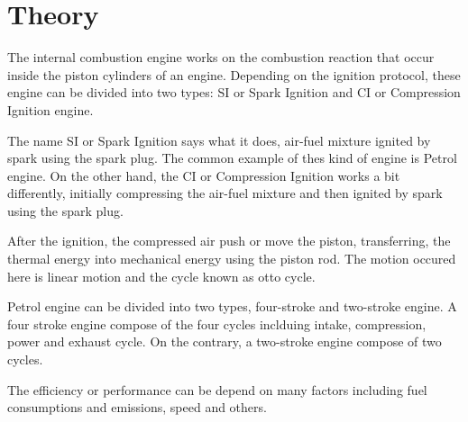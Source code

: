 \section{Theory}

The internal combustion engine works on the combustion reaction that occur inside the piston cylinders of an engine. Depending on the ignition protocol, these engine can be divided into two types: SI or Spark Ignition and CI or Compression Ignition engine.

The name SI or Spark Ignition says what it does, air-fuel mixture ignited by spark using the spark plug. The common example of thes kind of engine is Petrol engine. On the other hand, the CI or Compression Ignition works a bit differently, initially compressing the air-fuel mixture and then ignited by spark using the spark plug.

After the ignition, the compressed air push or move the piston, transferring, the thermal energy into mechanical energy using the piston rod. The motion occured here is linear motion and the cycle known as otto cycle.

Petrol engine can be divided into two types, four-stroke and two-stroke engine. A four stroke engine compose of the four cycles inclduing intake, compression, power and exhaust cycle. On the contrary, a two-stroke engine compose of two cycles.

The efficiency or performance can be depend on many factors including fuel consumptions and emissions, speed and others.